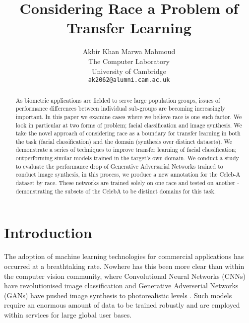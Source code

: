 \documentclass[10pt,twocolumn,letterpaper]{article}
\begin{document}
\title{Considering Race a Problem of Transfer Learning}

\author{Akbir Khan  \hspace{2cm} Marwa Mahmoud\\
The Computer Laboratory \\
University of Cambridge \\
{\tt\small ak2062@alumni.cam.ac.uk}
}
\maketitle
\ifwacvfinal\thispagestyle{empty}\fi

\begin{abstract}
As biometric applications are fielded to serve large population groups, issues of performance differences between individual sub-groups are becoming increasingly important. In this paper we examine cases where we believe race is one such factor. We look in particular at two forms of problem; facial classification and image synthesis. We take the novel approach of considering race as a boundary for transfer learning in both the task (facial classification) and the domain (synthesis over distinct datasets). We demonstrate a series of techniques to improve transfer learning of facial classification; outperforming similar models trained in the target's own domain. We conduct a study to evaluate the performance drop of Generative Adversarial Networks trained to conduct image synthesis, in this process, we produce a new annotation for the Celeb-A dataset by race. These networks are trained solely on one race and tested on another - demonstrating the subsets of the CelebA to be distinct domains for this task. 
\end{abstract}
\section{Introduction}
The adoption of machine learning technologies for commercial applications has occurred at a breathtaking rate. Nowhere has this been more clear than within the 
computer vision community, where Convolutional Neural Networks (CNNs) have revolutionised image classification \cite{rosten2006machine, Redmon:2015aa} and Generative Adverserial Networks (GANs) have pushed image synthesis to photorealistic levels \cite{DBLP:journals/corr/Wu0ZH17,DBLP:journals/corr/LedigTHCATTWS16}. Such models require an enormous amount of data to be trained robustly and are employed within services for large global user bases.
\end{document}
